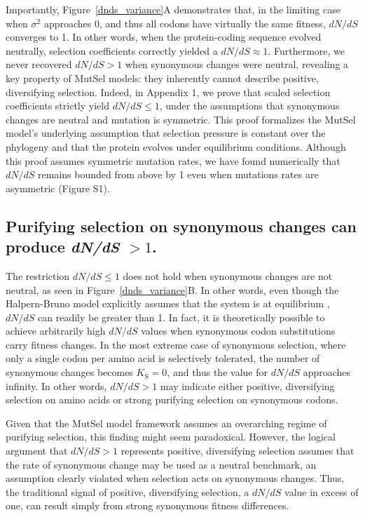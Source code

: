 \documentclass[11pt]{article}
\begin{document}
Importantly, Figure~\ref{dnds_variance}A demonstrates that, in the limiting case when $\sigma^2$ approaches 0, and thus all codons have virtually the same fitness, $dN/dS$ converges to 1. In other words, when the protein-coding sequence evolved neutrally, selection coefficients correctly yielded a $dN/dS \approx 1$. Furthermore, we never recovered $dN/dS > 1$ when synonymous changes were neutral, revealing a key property of MutSel models: they inherently cannot describe positive, diversifying selection. Indeed, in Appendix 1, we prove that scaled selection coefficients strictly yield $dN/dS \leq 1$, under the assumptions that synonymous changes are neutral and mutation is symmetric. This proof formalizes the MutSel model's underlying assumption that selection pressure is constant over the phylogeny and that the protein evolves under equilibrium conditions. Although this proof assumes symmetric mutation rates, we have found numerically that $dN/dS$ remains bounded from above by 1 even when mutations rates are asymmetric (Figure S1).

\subsection*{Purifying selection on synonymous changes can produce \emph{dN/dS} $>1$.}

The restriction $dN/dS \leq 1$ does not hold when synonymous changes are not neutral, as seen in Figure~\ref{dnds_variance}B. In other words, even though the Halpern-Bruno model explicitly assumes that the system is at equilibrium \citep{HalpernBruno1998,Thorne2012}, $dN/dS$ can readily be greater than 1. In fact, it is theoretically possible to achieve arbitrarily high $dN/dS$ values when synonymous codon substitutions carry fitness changes. In the most extreme case of synonymous selection, where only a single codon per amino acid is selectively tolerated, the number of synonymous changes becomes $K_\text{S} = 0$, and thus the value for $dN/dS$ approaches infinity. In other words, $dN/dS > 1$ may indicate either positive, diversifying selection on amino acids or strong purifying selection on synonymous codons.

Given that the MutSel model framework assumes an overarching regime of purifying selection, this finding might seem paradoxical. However, the logical argument that $dN/dS > 1$ represents positive, diversifying selection assumes that the rate of synonymous change may be used as a neutral benchmark, an assumption clearly violated when selection acts on synonymous changes. Thus, the traditional signal of positive, diversifying selection, a $dN/dS$ value in excess of one, can result simply from strong synonymous fitness differences. 
\end{document}
